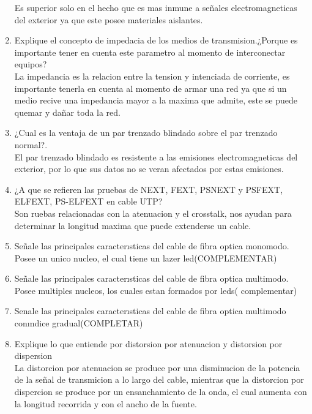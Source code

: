 \documentclass{udparticle}
\begin{document}
\begin{enumerate}
    Es superior solo en el hecho que es mas inmune a señales electromagneticas del exterior ya que este posee materiales aislantes.\\
    \item Explique el concepto de impedacia de los medios de transmision.¿Porque es importante tener en cuenta este parametro al momento de interconectar equipos? \\
    La impedancia es la relacion entre la tension y intenciada de corriente, es importante tenerla en cuenta al momento de armar una red ya que si un medio recive una impedancia mayor a la maxima que admite, este se puede quemar y dañar toda la red.\\
    \item ¿Cual es la ventaja de un par trenzado blindado sobre el par trenzado normal?.\\
    El par trenzado blindado es resistente a las emisiones electromagneticas del exterior, por lo que sus datos no se veran afectados por estas emisiones.\\
    \item ¿A que se reﬁeren las pruebas de NEXT, FEXT, PSNEXT y PSFEXT, ELFEXT, PS-ELFEXT en cable UTP?\\
    Son ruebas relacionadas con la atenuacion y el crosstalk, nos ayudan para determinar la longitud maxima que puede extenderse un cable.\\
  \item Señale las principales caracterısticas del cable de ﬁbra optica monomodo.\\
  Posee un unico nucleo, el cual tiene un lazer led(COMPLEMENTAR)\\
  \item Señale las principales caracterısticas del cable de ﬁbra optica multimodo. \\
  Posee multiples nucleos, los cuales estan formados por leds(  complementar)\\
  \item Senale las principales caracterısticas del cable de ﬁbra optica multimodo conındice gradual(COMPLETAR)\\
  \item Explique lo que entiende por distorsion por atenuacion y distorsion por dispersion\\
  La distorcion por atenuacion se produce por una disminucion de la potencia de la señal de transmicion a lo largo del cable, mientras que la distorcion por dispercion se produce por un ensanchamiento de la onda, el cual aumenta con la longitud recorrida y con el ancho de la fuente.\\

\end{enumerate}
\end{document}
